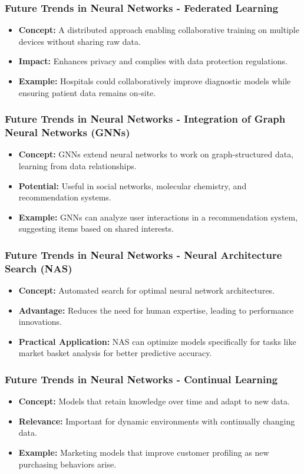 \documentclass[aspectratio=169]{beamer}
\begin{document}
\begin{frame}[fragile]
    \frametitle{Future Trends in Neural Networks - Federated Learning}
    \begin{itemize}
        \item \textbf{Concept:} A distributed approach enabling collaborative training on multiple devices without sharing raw data.
        \item \textbf{Impact:} Enhances privacy and complies with data protection regulations.
        \item \textbf{Example:} Hospitals could collaboratively improve diagnostic models while ensuring patient data remains on-site.
    \end{itemize}
\end{frame}

\begin{frame}[fragile]
    \frametitle{Future Trends in Neural Networks - Integration of Graph Neural Networks (GNNs)}
    \begin{itemize}
        \item \textbf{Concept:} GNNs extend neural networks to work on graph-structured data, learning from data relationships.
        \item \textbf{Potential:} Useful in social networks, molecular chemistry, and recommendation systems.
        \item \textbf{Example:} GNNs can analyze user interactions in a recommendation system, suggesting items based on shared interests.
    \end{itemize}
\end{frame}

\begin{frame}[fragile]
    \frametitle{Future Trends in Neural Networks - Neural Architecture Search (NAS)}
    \begin{itemize}
        \item \textbf{Concept:} Automated search for optimal neural network architectures.
        \item \textbf{Advantage:} Reduces the need for human expertise, leading to performance innovations.
        \item \textbf{Practical Application:} NAS can optimize models specifically for tasks like market basket analysis for better predictive accuracy.
    \end{itemize}
\end{frame}

\begin{frame}[fragile]
    \frametitle{Future Trends in Neural Networks - Continual Learning}
    \begin{itemize}
        \item \textbf{Concept:} Models that retain knowledge over time and adapt to new data.
        \item \textbf{Relevance:} Important for dynamic environments with continually changing data.
        \item \textbf{Example:} Marketing models that improve customer profiling as new purchasing behaviors arise.
    \end{itemize}
\end{frame}
\end{document}
